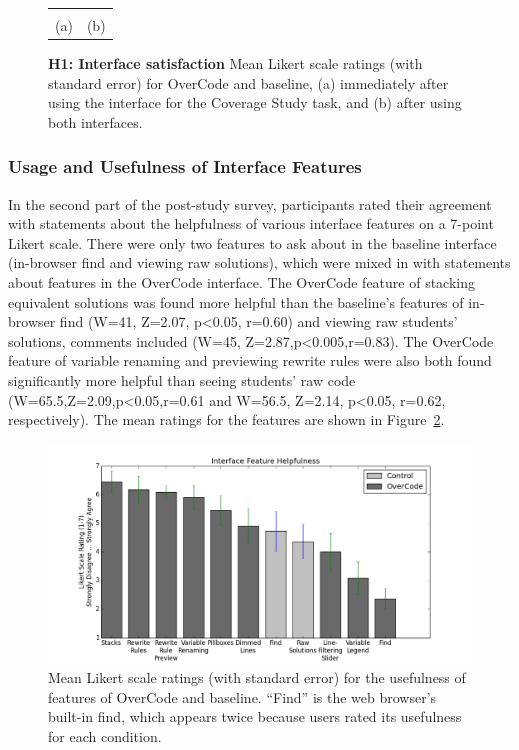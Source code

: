 \begin{figure}
\begin{tabular}{c c}
\begin{minipage}{.4\linewidth}
\end{minipage}
\\
(a) & (b)
\end{tabular}
\caption{{\bf H1: Interface satisfaction} Mean Likert scale ratings (with standard error) for  OverCode and baseline, (a) immediately after using the interface for the Coverage Study task, and (b) after using both interfaces.}
\label{studyLikert1_onPop2}
\end{figure}

\subsubsection{Usage and Usefulness of Interface Features}

In the second part of the post-study survey, participants rated their agreement with statements about the helpfulness of various interface features on a 7-point Likert scale. There were only two features to ask about in the baseline interface (in-browser find and viewing raw solutions), which were mixed in with statements about features in the OverCode interface. The OverCode feature of stacking equivalent solutions was found more helpful than the baseline's features of in-browser find (W=41, Z=2.07, p<0.05, r=0.60) and viewing raw students' solutions, comments included (W=45, Z=2.87,p<0.005,r=0.83). The OverCode feature of variable renaming and previewing rewrite rules were also both found significantly more helpful than seeing students' raw code (W=65.5,Z=2.09,p<0.05,r=0.61 and W=56.5, Z=2.14, p<0.05, r=0.62, respectively). The mean ratings for the features are shown in Figure~\ref{featureHelpfulness}.

\begin{figure}
\centering
\includegraphics[scale=0.5]{Body/figures/overcode/featureHelpfulness.png}
\caption{Mean Likert scale ratings (with standard error) for the usefulness of features of OverCode and baseline.  ``Find'' is the web browser's built-in find, which appears twice because users rated its usefulness for each condition.}
\label{featureHelpfulness}
\end{figure}

